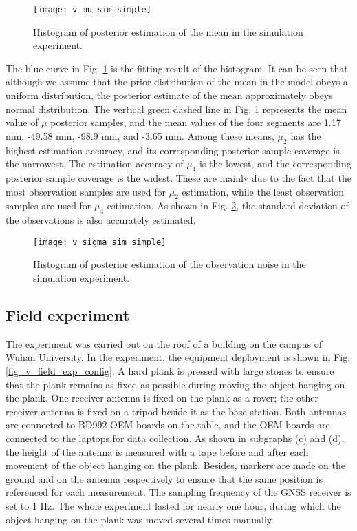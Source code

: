 \documentclass{svjour3}                     %
\begin{document}
\begin{figure}[htbp]
	\centering
	\texttt{[image: v\_mu\_sim\_simple]}
	\caption{Histogram of posterior estimation of the mean in the simulation experiment.}
	\label{fig_v_mu_sim_simple}
\end{figure} 
The blue curve in Fig. \ref{fig_v_mu_sim_simple} is the fitting result of the histogram. It can be seen that although we assume that the prior distribution of the mean in the model obeys a uniform distribution, the posterior estimate of the mean approximately obeys normal distribution. The vertical green dashed line in Fig. \ref{fig_v_mu_sim_simple} represents the mean value of \textbf{$\mu$} posterior samples, and the mean values of the four segments are 1.17 mm, -49.58 mm, -98.9 mm, and -3.65 mm.
Among these means, $\mu_2$ has the highest estimation accuracy, and its corresponding posterior sample coverage is the narrowest. The estimation accuracy of $\mu_4$ is the lowest, and the corresponding posterior sample coverage is the widest. These are mainly due to the fact that the most observation samples are used for $\mu_2$ estimation, while the least observation samples are used for $\mu_4$ estimation. As shown in Fig. \ref{fig_v_sigma_sim_simple}, the standard deviation of the observations is also accurately estimated.

\begin{figure}[htbp]
	\centering
	\texttt{[image: v\_sigma\_sim\_simple]}
	\caption{Histogram of posterior estimation of the observation noise in the simulation experiment.}
	\label{fig_v_sigma_sim_simple}
\end{figure} 



\subsection{Field experiment}
The experiment was carried out on the roof of a building on the campus of Wuhan University. In the experiment, the equipment deployment is shown in Fig. \ref{fig_v_field_exp_config}. A hard plank is pressed with large stones to ensure that the plank remains as fixed as possible during moving the object hanging on the plank. One receiver antenna is fixed on the plank as a rover; the other receiver antenna is fixed on a tripod beside it as the base station. Both antennas are connected to BD992 OEM boards on the table, and the OEM boards are connected to the laptops for data collection. As shown in subgraphs (c) and (d), the height of the antenna is measured with a tape before and after each movement of the object hanging on the plank. Besides, markers are made on the ground and on the antenna respectively to ensure that the same position is referenced for each measurement. The sampling frequency of the GNSS receiver is set to 1 Hz. The whole experiment lasted for nearly one hour, during which the object hanging on the plank was moved several times manually.
\end{document}
